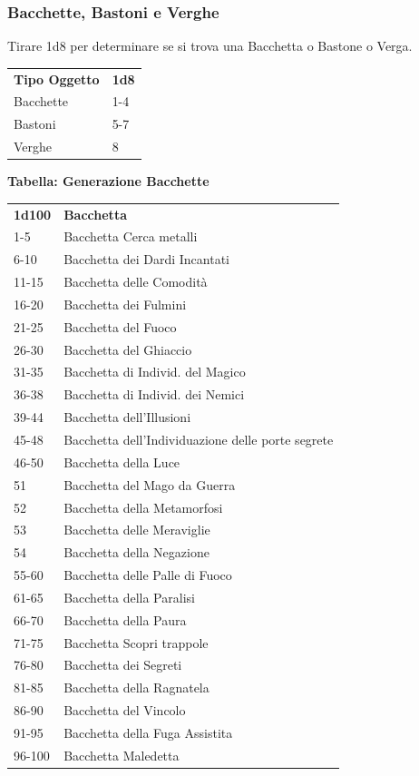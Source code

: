 \begin{multicols}{2}
	\subsubsection{Bacchette, Bastoni e Verghe}

	Tirare 1d8 per determinare se si trova una Bacchetta o Bastone o Verga.

	\medskip

	\begin{tabular}{ll}\\
		\textbf{Tipo Oggetto}&\textbf{1d8}\\
		Bacchette&1-4\\
		Bastoni&5-7\\
		Verghe&8\\
	\end{tabular}

	\medskip

	\textbf{Tabella: Generazione Bacchette}

	\medskip

	\begin{tabularx}{0.45\textwidth}{lX}
		\textbf{1d100} & \textbf{Bacchetta}\\
		1-5& Bacchetta Cerca metalli\\
		6-10 &Bacchetta dei Dardi Incantati\\
		11-15 &Bacchetta delle Comodità\\
		16-20 &Bacchetta dei Fulmini\\
		21-25& Bacchetta del Fuoco\\
		26-30& Bacchetta del Ghiaccio\\
		31-35& Bacchetta di Individ. del Magico\\
		36-38& Bacchetta di Individ. dei Nemici\\
		39-44& Bacchetta dell'Illusioni\\
		45-48& Bacchetta dell'Individuazione delle porte segrete\\
		46-50& Bacchetta della Luce\\
		51 &Bacchetta del Mago da Guerra\\
		52 &Bacchetta della Metamorfosi\\
		53 &Bacchetta delle Meraviglie\\
		54 &Bacchetta della Negazione\\
		55-60& Bacchetta delle Palle di Fuoco\\
		61-65 &Bacchetta della Paralisi\\
		66-70& Bacchetta della Paura\\
		71-75 &Bacchetta Scopri trappole\\
		76-80& Bacchetta dei Segreti\\
		81-85& Bacchetta della Ragnatela\\
		86-90& Bacchetta del Vincolo\\
		91-95& Bacchetta della Fuga Assistita\\
		96-100&Bacchetta Maledetta\\
	\end{tabularx}


\end{multicols}

